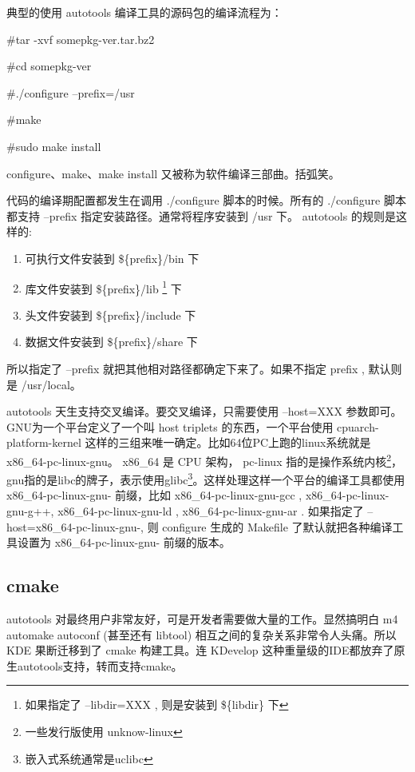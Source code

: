 典型的使用 autotools 编译工具的源码包的编译流程为：

\begin{code}
\#tar -xvf somepkg-ver.tar.bz2

\#cd somepkg-ver

\#./configure --prefix=/usr %

\#make

\#sudo make install
\end{code}

configure、make、make install 又被称为软件编译三部曲。括弧笑。

代码的编译期配置都发生在调用 ./configure 脚本的时候。所有的 ./configure 脚本都支持 --prefix 指定安装路径。通常将程序安装到 /usr 下。
autotools 的规则是这样的:

\begin{enumerate}
\item 可执行文件安装到 \$\{prefix\}/bin 下
\item 库文件安装到 \$\{prefix\}/lib \footnote{如果指定了 --libdir=XXX , 则是安装到 \$\{libdir\} 下 } 下
\item 头文件安装到 \$\{prefix\}/include 下
\item 数据文件安装到 \$\{prefix\}/share 下
\end{enumerate}

所以指定了 --prefix 就把其他相对路径都确定下来了。如果不指定 prefix , 默认则是 /usr/local。

autotools 天生支持交叉编译。要交叉编译，只需要使用 --host=XXX 参数即可。
GNU为一个平台定义了一个叫 host triplets 的东西，一个平台使用 cpuarch-platform-kernel 这样的三组来唯一确定。比如64位PC上跑的linux系统就是 x86\_64-pc-linux-gnu。 x86\_64 是 CPU 架构， pc-linux 指的是操作系统内核\footnote{一些发行版使用 unknow-linux}，gnu指的是libc的牌子，表示使用glibc\footnote{嵌入式系统通常是uclibc}。这样处理这样一个平台的编译工具都使用 x86\_64-pc-linux-gnu- 前缀，比如 x86\_64-pc-linux-gnu-gcc , x86\_64-pc-linux-gnu-g++,  x86\_64-pc-linux-gnu-ld , x86\_64-pc-linux-gnu-ar . 如果指定了 --host=x86\_64-pc-linux-gnu-,  则 configure 生成的 Makefile 了默认就把各种编译工具设置为 x86\_64-pc-linux-gnu- 前缀的版本。


\subsection{cmake}\label{section:cmake}

autotools 对最终用户非常友好，可是开发者需要做大量的工作。显然搞明白 m4 automake autoconf (甚至还有 libtool) 相互之间的复杂关系非常令人头痛。所以 KDE 果断迁移到了 cmake 构建工具。连 KDevelop 这种重量级的IDE都放弃了原生autotools支持，转而支持cmake。

